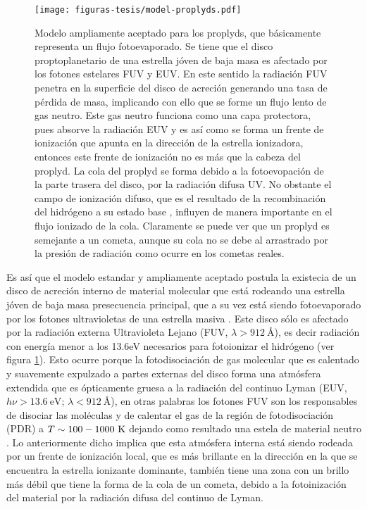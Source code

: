 \begin{figure}
  \centering
  \texttt{[image: figuras-tesis/model-proplyds.pdf]}
  \caption{Modelo ampliamente aceptado para los proplyds, que básicamente representa un flujo fotoevaporado. Se tiene que el disco proptoplanetario de una estrella jóven de baja masa es afectado por los fotones estelares FUV y EUV. En este sentido la radiación FUV penetra en la superficie del disco de acreción generando una tasa de pérdida de masa, implicando con ello que se forme un flujo lento de gas neutro. Este gas neutro funciona como una capa protectora, pues absorve la radiación EUV y es así como se forma un frente de ionización que apunta en la dirección de la estrella ionizadora, entonces este frente de ionización no es más que la cabeza del proplyd. La cola del proplyd se forma debido a la fotoevopación de la parte trasera  del disco, por la radiación difusa UV. No obstante el campo de ionización difuso, que es el resultado de la recombinación del hidrógeno a su estado base \citep{Henney:1999a}, influyen de manera importante en el flujo ionizado de la cola. Claramente se puede ver que un proplyd es semejante a un cometa, aunque su cola no se debe al arrastrado por la presión de radiación como ocurre en los cometas reales. }
  \label{fig:modelo-proplyd}
\end{figure}

Es así que el modelo estandar y ampliamente aceptado postula la existecia de un  disco de acreción interno de material molecular que está rodeando una estrella jóven de baja masa presecuencia principal, que a su vez está siendo fotoevaporado por los fotones ultravioletas de una estrella masiva \citep{Johnstone:1998, Henney:1998a}. Este disco sólo es afectado por la radiación externa Ultravioleta Lejano (FUV, \(\lambda > 912~\text{\AA{}} \)), es decir radiación con energía menor a los 13.6eV necesarios para fotoionizar el hidrógeno (ver figura \ref{fig:modelo-proplyd}). Esto ocurre porque la fotodisociación de gas molecular que es calentado y suavemente expulzado a partes externas del disco forma una atmósfera extendida que es ópticamente gruesa a la radiación del continuo Lyman (EUV, \(h\nu > 13.6~\text{eV}\); \(\lambda < 912~\text{\AA{}} \)), en otras palabras los fotones FUV son los responsables de disociar las moléculas y de calentar el gas de la región de fotodisociación (PDR) a \(T\sim100-1000~\mathrm{K}\) dejando como resultado una estela de material neutro \citep{Johnstone:1998}. Lo anteriormente dicho implica que esta atmósfera interna está siendo rodeada por un frente de ionización local, que es más brillante en la dirección en la que se encuentra la estrella ionizante dominante, también tiene una zona con un brillo más débil que tiene la forma de la cola de un cometa, debido a la fotoinización del material por la radiación difusa del continuo de Lyman.\\ 

